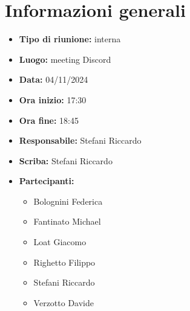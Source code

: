 \section{Informazioni generali}

\begin{itemize}
    \item \textbf{Tipo di riunione:} interna
    \item \textbf{Luogo:} meeting Discord
    \item \textbf{Data:} 04/11/2024
    \item \textbf{Ora inizio:} 17:30
    \item \textbf{Ora fine:} 18:45
    \item \textbf{Responsabile:} Stefani Riccardo
    \item \textbf{Scriba:} Stefani Riccardo
    \item \textbf{Partecipanti:}
    \begin{itemize}
        \renewcommand{\labelitemii}{--}
        \item Bolognini Federica
        \item Fantinato Michael
        \item Loat Giacomo
        \item Righetto Filippo
        \item Stefani Riccardo
        \item Verzotto Davide
    \end{itemize}
\end{itemize}
